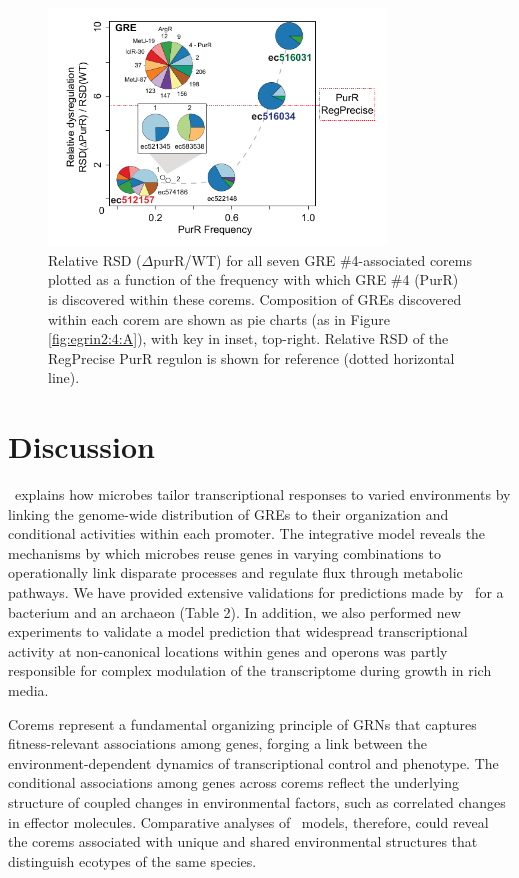 \begin{figure}[h!]
    \centering
    \includegraphics[width=0.8\textwidth]{figures/egrin2_ecoli_purR_predictive}
 	\caption[GRE \#4 influence predicts which corems are disrupted in $\Delta$purR mutant]{Relative RSD ($\Delta$purR/WT) for all seven GRE \#4-associated corems plotted as a function of the frequency with which GRE \#4 (PurR) is discovered within these corems. Composition of GREs discovered within each corem are shown as pie charts (as in Figure \ref{fig:egrin2:4:A}), with key in inset, top-right. Relative RSD of the RegPrecise PurR regulon is shown for reference (dotted horizontal line).
}
    \label{fig:egrin2:5:C}
\end{figure}

\section{Discussion}

\egrine~explains how microbes tailor transcriptional responses to varied environments by linking the genome-wide distribution of GREs to their organization and conditional activities within each promoter. The integrative model reveals the mechanisms by which microbes reuse genes in varying combinations to operationally link disparate processes and regulate flux through metabolic pathways. We have provided extensive validations for predictions made by \egrine~for a bacterium and an archaeon (Table 2). In addition, we also performed new experiments to validate a model prediction that widespread transcriptional activity at non-canonical locations within genes and operons was partly responsible for complex modulation of the \eco transcriptome during growth in rich media.  

Corems represent a fundamental organizing principle of GRNs that captures fitness-relevant associations among genes, forging a link between the environment-dependent dynamics of transcriptional control and phenotype. The conditional associations among genes across corems reflect the underlying structure of coupled changes in environmental factors, such as correlated changes in effector molecules. Comparative analyses of \egrine~models, therefore, could reveal the corems associated with unique and shared environmental structures that distinguish ecotypes of the same species.

